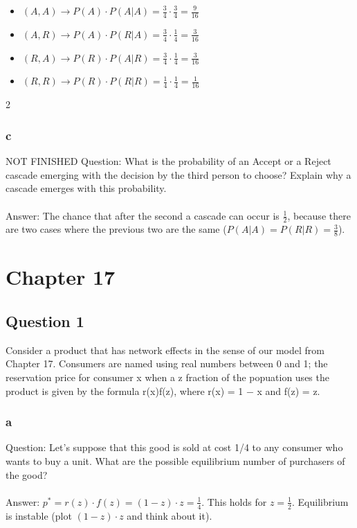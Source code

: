 \documentclass[12pt]{scrartcl}
\begin{document}
\begin{itemize}
\item $(A,A) \rightarrow P(A)\cdot P(A|A) = \frac{3}{4}\cdot \frac{3}{4} = \frac{9}{16}$
\item $(A,R) \rightarrow P(A)\cdot P(R|A) = \frac{3}{4}\cdot \frac{1}{4} = \frac{3}{16}$
\item $(R,A) \rightarrow P(R)\cdot P(A|R) = \frac{3}{4}\cdot \frac{1}{4} = \frac{3}{16}$
\item $(R,R) \rightarrow P(R)\cdot P(R|R) = \frac{1}{4}\cdot \frac{1}{4} = \frac{1}{16}$
\end{itemize}
2
\subsubsection*{c}
NOT FINISHED
Question: What is the probability of an Accept or a Reject cascade emerging with the decision by the third person to choose? Explain why a cascade emerges with this probability.\\\\
Answer: The chance that after the second a cascade can occur is $\frac{1}{2}$, because there are two cases where the previous two are the same ($P(A|A) = P(R|R) = \frac{3}{8}$).  

\section{Chapter 17}
\subsection*{Question 1}
Consider a product that has network effects in the sense of our model from Chapter 17.
Consumers are named using real numbers between 0 and 1; the reservation price for
consumer x when a z fraction of the popuation uses the product is given by the formula
r(x)f(z), where r(x) = 1 − x and f(z) = z.
\subsubsection*{a}
Question: Let’s suppose that this good is sold at cost 1/4 to any consumer who wants to
buy a unit. What are the possible equilibrium number of purchasers of the good?\\\\
Answer: $p^{*} = r(z)\cdot f(z) = (1-z)\cdot z = \frac{1}{4}$. This holds for $z = \frac{1}{2}$. Equilibrium is instable (plot $(1-z)\cdot z$ and think about it).
\end{document}
